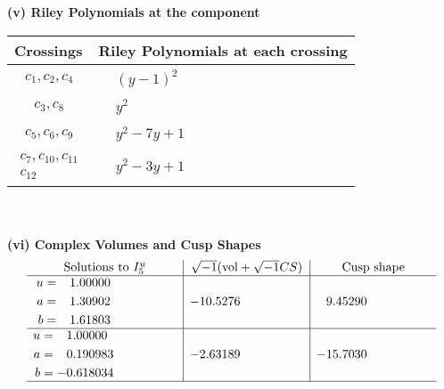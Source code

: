 \documentclass[1p]{elsarticle_modified}
\theoremstyle{definition}
\newcommand{\I}{\sqrt{-1}}
\begin{document}
\newpage\renewcommand{\arraystretch}{1}
\flushleft \textbf{(v) Riley Polynomials at the component}\newline \\
\begin{tabular}{m{50pt}|m{274pt}}
Crossings & \hspace{64pt}Riley Polynomials at each crossing \\
\hline $$\begin{aligned}c_{1},c_{2},c_{4}\end{aligned}$$&$\begin{aligned}
&(y-1)^2
\end{aligned}$\\
\hline $$\begin{aligned}c_{3},c_{8}\end{aligned}$$&$\begin{aligned}
&y^2
\end{aligned}$\\
\hline $$\begin{aligned}c_{5},c_{6},c_{9}\end{aligned}$$&$\begin{aligned}
&y^2-7 y+1
\end{aligned}$\\
\hline $$\begin{aligned}c_{7},c_{10},c_{11}\\c_{12}\end{aligned}$$&$\begin{aligned}
&y^2-3 y+1
\end{aligned}$\\
\hline
\end{tabular}\\~\\
\newpage\flushleft \textbf{(vi) Complex Volumes and Cusp Shapes}
$$\begin{array}{c|c|c}  
\text{Solutions to }I^u_{5}& \I (\text{vol} + \sqrt{-1}CS) & \text{Cusp shape}\\
 \hline 
\begin{aligned}
u &= \phantom{-}1.00000\phantom{ +0.000000I} \\
a &= \phantom{-}1.30902\phantom{ +0.000000I} \\
b &= \phantom{-}1.61803\phantom{ +0.000000I}\end{aligned}
 & -10.5276\phantom{ +0.000000I} & \phantom{-}9.45290\phantom{ +0.000000I} \\ \hline\begin{aligned}
u &= \phantom{-}1.00000\phantom{ +0.000000I} \\
a &= \phantom{-}0.190983\phantom{ +0.000000I} \\
b &= -0.618034\phantom{ +0.000000I}\end{aligned}
 & -2.63189\phantom{ +0.000000I} & -15.7030\phantom{ +0.000000I}\\
 \hline 
 \end{array}$$\newpage
\end{document}
